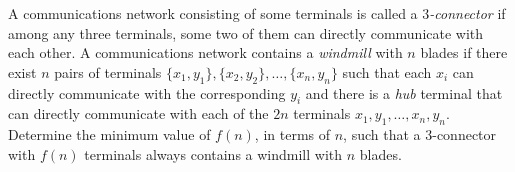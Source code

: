 A communications network consisting of some terminals is called a \emph{$3$-connector} if among any three terminals, some two of them can directly communicate with each other. A communications network contains a \emph{windmill} with $n$ blades if there exist $n$ pairs of terminals $\{x_{1},y_{1}\},\{x_{2},y_{2}\},\ldots,\{x_{n},y_{n}\}$ such that each $x_{i}$ can directly communicate with the corresponding $y_{i}$ and there is a \emph{hub} terminal that can directly communicate with each of the $2n$ terminals $x_{1}, y_{1},\ldots,x_{n}, y_{n}$. Determine the minimum value of $f (n)$, in terms of $n$, such that a $3$-connector with $f (n)$ terminals always contains a windmill with $n$ blades.